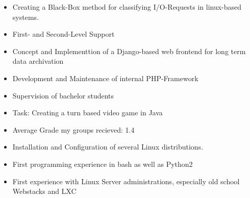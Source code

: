 \documentclass[10pt,a4paper,ragged2e,withhyper]{altacv}
\begin{document}
\begin{paracol}{2}

\medskip
\begin{itemize}
\item Creating a Black-Box method for classifying I/O-Requests in linux-based systems.
\end{itemize}

\divider
{}
\medskip
\begin{itemize}
\item First- and Second-Level Support
\item Concept and Implementtion of a Django-based web frontend for long term data archivation
\end{itemize}

\divider

\medskip
\begin{itemize}
\item Development and Maintenance of internal PHP-Framework
\end{itemize}

\divider

\medskip
\begin{itemize}
\item Supervision of bachelor students
\item Task: Creating a turn based video game in Java
\item Average Grade my groups recieved: 1.4
\end{itemize}

\divider

\medskip
\begin{itemize}
\item Installation and Configuration of several Linux distributions.
\item First programming experience in bash as well as Python2
\item First experience with Linux Server administrations, especially old school Webstacks and LXC
\end{itemize}


\end{paracol}
\end{document}

